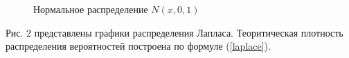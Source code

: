 \documentclass[12pt]{article}
\newcommand{\lskip}{\hfill\break}
\begin{document}
\begin{flushleft}
\begin{figure}[h]
\begin{minipage}[h]{0.325\linewidth}
        \end{minipage}
        \caption{Нормальное распределение $N(x, 0, 1)$}
    \end{figure}
    \lskip

     Рис. 2 представлены графики распределения Лапласа. Теоритическая плотность распределения вероятностей построена по формуле (\ref{laplace}).

    \begin{figure}[h!]
        \begin{minipage}[h]{0.325\linewidth}
        \end{minipage}
        \begin{minipage}[h]{0.325\linewidth}
        \end{minipage}
        \begin{minipage}[h]{0.325\linewidth}

\end{minipage}
\end{figure}
\end{flushleft}
\end{document}
